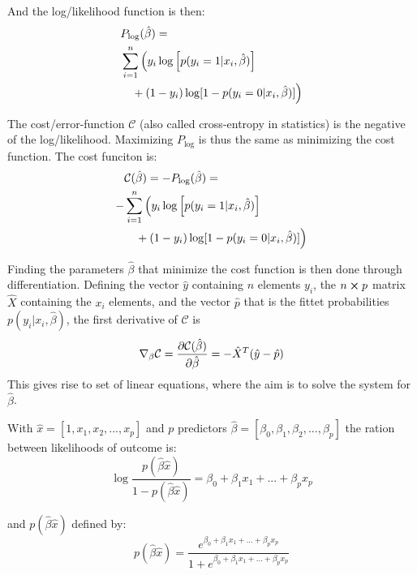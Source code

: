 And the log/likelihood function is then:
\begin{equation}
\begin{split}
    &P_{\log}(\hat{\beta}) = \\
    &\sum_{i=1}^n \Big(y_i \log \qty[p(y_i = 1|x_i,\hat{\beta})] \\
    &\quad+ (1-y_i) \log [1 - p(y_i = 0|x_i,\hat{\beta})]\Big)
\end{split}
\label{eq:log_p}
\end{equation}

The cost/error-function $\mathcal{C}$ (also called cross-entropy in statistics) is the negative of the log/likelihood. Maximizing $P_{\log}$ is thus the same as minimizing the cost function. The cost funciton is:
\begin{equation}
  \begin{split}
    &\mathcal{C}(\hat{\beta}) = - P_{\log}(\hat{\beta}) =  \\
    -&\sum_{i=1}^n \Big(y_i \log \qty[p(y_i = 1|x_i,\hat{\beta})] \\
    &\quad+ (1-y_i) \log [1 - p(y_i = 0|x_i,\hat{\beta})]\Big)
  \end{split}
  \label{eq:cost_function}
\end{equation}

Finding the parameters $\hat{\beta}$ that minimize the cost function is then done through differentiation.
Defining the vector $\hat{y}$ containing $n$ elements $y_i$, the $n \cross p$ matrix $\hat{X}$ containing the $x_i$ elements, and the vector $\hat{p}$ that is the fittet probabilities $p(y_i|x_i,\hat{\beta})$, the first derivative of $\mathcal{C}$ is
\begin{equation}
  \nabla_\beta \mathcal{C} = \pdv{\mathcal{C}(\hat{\beta})}{\hat{\beta}} = - \hat{X}^T (\hat{y}-\hat{p})
  \label{eq:cost_d}
\end{equation}
This gives rise to set of linear equations, where the aim is to solve the system for $\hat{\beta}$.

With $\hat{x} = [1, x_1,x_2,...,x_p]$ and $p$ predictors $\hat{\beta} = [\beta_0,\beta_1,\beta_2,...,\beta_p]$ the ration between likelihoods of outcome is:
\begin{equation}
  \log \frac{p(\hat{\beta}\hat{x})}{1-p(\hat{\beta}\hat{x})} = \beta_0 + \beta_1x_1 + ... + \beta_px_p
  \label{eq:prob_ratio}
\end{equation}

\noindent and $p(\hat{\beta}\hat{x})$ defined by:
\begin{equation}
  p(\hat{\beta}\hat{x}) = \frac{e^{\beta_0 + \beta_1x_1 + ... + \beta_px_p}}{1+e^{\beta_0 + \beta_1x_1 + ... + \beta_px_p}}
  \label{eq:pBx}
\end{equation}

